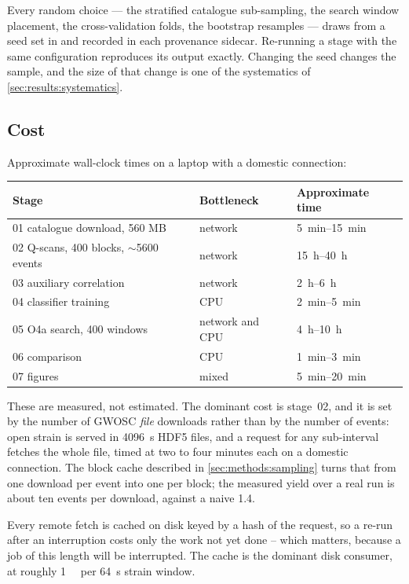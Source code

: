 Every random choice --- the stratified catalogue sub-sampling, the search
window placement, the cross-validation folds, the bootstrap resamples ---
draws from a seed set in  and recorded in each
provenance sidecar. Re-running a stage with the same configuration reproduces
its output exactly. Changing the seed changes the sample, and the size of that
change is one of the systematics of \cref{sec:results:systematics}.

\subsection{Cost}

Approximate wall-clock times on a laptop with a domestic connection:

\begin{center}
\small
\begin{tabular}{lll}
\toprule
Stage & Bottleneck & Approximate time \\
\midrule
01 catalogue download, 560 MB & network & \SIrange{5}{15}{\minute} \\
02 Q-scans, 400 blocks, $\sim$5600 events & network & \SIrange{15}{40}{\hour} \\
03 auxiliary correlation & network & \SIrange{2}{6}{\hour} \\
04 classifier training & CPU & \SIrange{2}{5}{\minute} \\
05 O4a search, 400 windows & network and CPU & \SIrange{4}{10}{\hour} \\
06 comparison & CPU & \SIrange{1}{3}{\minute} \\
07 figures & mixed & \SIrange{5}{20}{\minute} \\
\bottomrule
\end{tabular}
\end{center}

These are measured, not estimated. The dominant cost is stage~02, and it is
set by the number of GWOSC \emph{file} downloads rather than by the number of
events: open strain is served in \SI{4096}{\second} HDF5 files, and a request
for any sub-interval fetches the whole file, timed at two to four minutes each
on a domestic connection. The block cache described in
\cref{sec:methods:sampling} turns that from one download per event into one
per block; the measured yield over a real run is about ten events per
download, against a naive 1.4.

Every remote fetch is cached on disk keyed by a hash of the request, so a
re-run after an interruption costs only the work not yet done -- which matters,
because a job of this length will be interrupted. The cache is
the dominant disk consumer, at roughly \SI{1}{\mega\byte} per
\SI{64}{\second} strain window.

